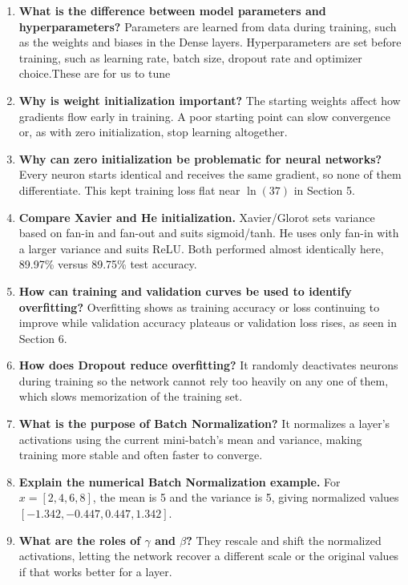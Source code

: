 \documentclass[10pt]{article}
\begin{document}
\begin{enumerate}
\item \textbf{What is the difference between model parameters and hyperparameters?}
Parameters are learned from data during training, such as the weights and biases in the Dense
layers. Hyperparameters are set before training, such as learning rate, batch size, dropout
rate and optimizer choice.These are for us to tune 

\item \textbf{Why is weight initialization important?}
The starting weights affect how gradients flow early in training. A poor starting point can
slow convergence or, as with zero initialization, stop learning altogether.

\item \textbf{Why can zero initialization be problematic for neural networks?}
Every neuron starts identical and receives the same gradient, so none of them differentiate.
This kept training loss flat near $\ln(37)$ in Section 5.

\item \textbf{Compare Xavier and He initialization.}
Xavier/Glorot sets variance based on fan-in and fan-out and suits sigmoid/tanh. He uses only
fan-in with a larger variance and suits ReLU. Both performed almost identically here, 89.97\%
versus 89.75\% test accuracy.

\item \textbf{How can training and validation curves be used to identify overfitting?}
Overfitting shows as training accuracy or loss continuing to improve while validation accuracy
plateaus or validation loss rises, as seen in Section 6.

\item \textbf{How does Dropout reduce overfitting?}
It randomly deactivates neurons during training so the network cannot rely too heavily on any
one of them, which slows memorization of the training set.

\item \textbf{What is the purpose of Batch Normalization?}
It normalizes a layer's activations using the current mini-batch's mean and variance, making
training more stable and often faster to converge.

\item \textbf{Explain the numerical Batch Normalization example.}
For $x = [2, 4, 6, 8]$, the mean is 5 and the variance is 5, giving normalized values
$[-1.342, -0.447, 0.447, 1.342]$.

\item \textbf{What are the roles of $\gamma$ and $\beta$?}
They rescale and shift the normalized activations, letting the network recover a different
scale or the original values if that works better for a layer.


\end{enumerate}
\end{document}
